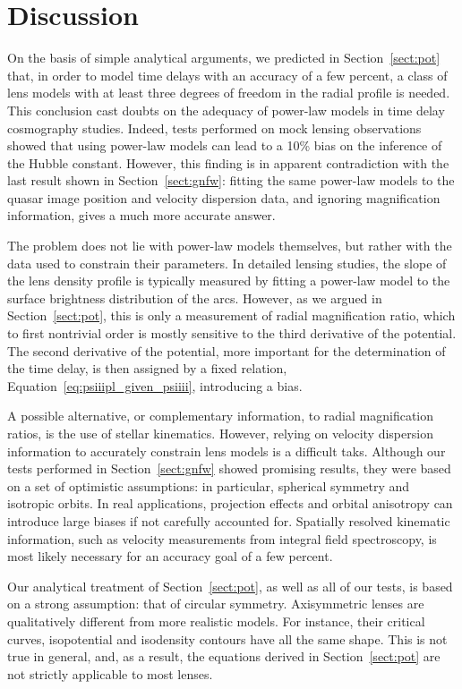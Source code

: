 \documentclass[usenatbib]{mnras}
\def\Sref#1{Section~\ref{#1}\xspace}
\def\Eref#1{Equation~\ref{#1}\xspace}
\begin{document}
\section{Discussion}

On the basis of simple analytical arguments, we predicted in \Sref{sect:pot} that, in order to model time delays with an accuracy of a few percent, a class of lens models with at least three degrees of freedom in the radial profile is needed.
This conclusion cast doubts on the adequacy of power-law models in time delay cosmography studies.
Indeed, tests performed on mock lensing observations showed that using power-law models can lead to a 10\% bias on the inference of the Hubble constant.
However, this finding is in apparent contradiction with the last result shown in \Sref{sect:gnfw}: fitting the same power-law models to the quasar image position and velocity dispersion data, and ignoring magnification information, gives a much more accurate answer.

The problem does not lie with power-law models themselves, but rather with the data used to constrain their parameters.
In detailed lensing studies, the slope of the lens density profile is typically measured by fitting a power-law model to the surface brightness distribution of the arcs.
However, as we argued in \Sref{sect:pot}, this is only a measurement of radial magnification ratio, which to first nontrivial order is mostly sensitive to the third derivative of the potential.
The second derivative of the potential, more important for the determination of the time delay, is then assigned by a fixed relation, \Eref{eq:psiiipl_given_psiiii}, introducing a bias.

A possible alternative, or complementary information, to radial magnification ratios, is the use of stellar kinematics.
However, relying on velocity dispersion information to accurately constrain lens models is a difficult taks.
Although our tests performed in \Sref{sect:gnfw} showed promising results, they were based on a set of optimistic assumptions: in particular, spherical symmetry and isotropic orbits.
In real applications, projection effects and orbital anisotropy can introduce large biases if not carefully accounted for.
Spatially resolved kinematic information, such as velocity measurements from integral field spectroscopy, is most likely necessary for an accuracy goal of a few percent.

Our analytical treatment of \Sref{sect:pot}, as well as all of our tests, is based on a strong assumption: that of circular symmetry.
Axisymmetric lenses are qualitatively different from more realistic models.
For instance, their critical curves, isopotential and isodensity contours have all the same shape.
This is not true in general, and, as a result, the equations derived in \Sref{sect:pot} are not strictly applicable to most lenses.
\end{document}
